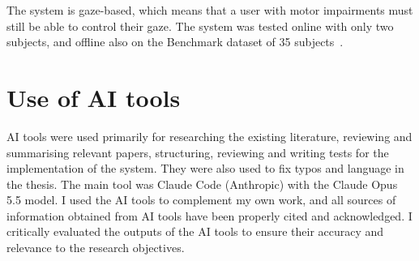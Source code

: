 The system is gaze-based, which means that a user with motor impairments must still be
able to control their gaze. The system was tested online with only two subjects, and
offline also on the Benchmark dataset of 35 subjects~\citep{wang2017benchmark}.

\section{Use of AI tools}
\label{sec:ai-use}

AI tools were used primarily for researching the existing literature, reviewing and
summarising relevant papers, structuring, reviewing and writing tests for the implementation 
of the system. They were also used to fix typos and language in the thesis. The main tool was
Claude Code (Anthropic) with the Claude Opus 5.5 model. I used the AI tools to complement
my own work, and all sources of information obtained from AI tools have been properly
cited and acknowledged. I critically evaluated the outputs of the AI tools to ensure their
accuracy and relevance to the research objectives.
